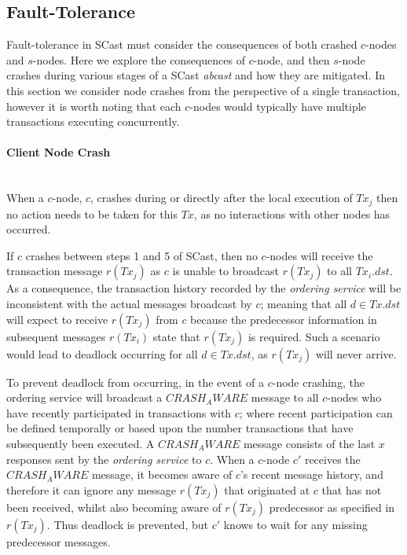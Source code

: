 	\subsection{Fault-Tolerance}
	Fault-tolerance in \textsf{SCast} must consider the consequences of both crashed $c$-nodes and $s$-nodes.  Here we explore the consequences of $c$-node, and then $s$-node crashes during various stages of a \textsf{SCast} \emph{abcast} and how they are mitigated.  In this section we consider node crashes from the perspective of a single transaction, however it is worth noting that each $c$-nodes would typically have multiple transactions executing concurrently.  
	
	\paragraph{Client Node Crash} \hspace{0pt} \\
	When a $c$-node, $c$, crashes during or directly after the local execution of $Tx_j$ then no action needs to be taken for this $Tx$, as no interactions with other nodes has occurred.  
	
	If $c$ crashes between steps 1 and 5 of \textsf{SCast}, then no $c$-nodes will receive the transaction message $r(Tx_j)$ as $c$ is unable to broadcast $r(Tx_j)$ to all $Tx_i.dst$.  As a consequence, the transaction history recorded by the \emph{ordering service} will be inconsistent with the actual messages broadcast by $c$; meaning that all $d \in Tx.dst$ will expect to receive $r(Tx_j)$ from $c$ because the predecessor information in subsequent messages $r(Tx_i)$ state that $r(Tx_j)$ is required.  Such a scenario would lead to deadlock occurring for all $d \in Tx.dst$, as $r(Tx_j)$ will never arrive.  
	
	To prevent deadlock from occurring, in the event of a $c$-node crashing, the ordering service will broadcast a $CRASH_AWARE$ message to all $c$-nodes who have recently participated in transactions with $c$; where recent participation can be defined temporally or based upon the number transactions that have subsequently been executed.  A $CRASH_AWARE$ message consists of the last $x$ responses sent by the \emph{ordering service} to $c$.  When a $c$-node $c'$ receives the $CRASH_AWARE$ message, it becomes aware of $c$'s recent message history, and therefore it can ignore any message $r(Tx_j)$ that originated at $c$ that has not been received, whilst also becoming aware of $r(Tx_j)$ predecessor as specified in $r(Tx_j)$. Thus deadlock is prevented, but $c'$ knows to wait for any missing predecessor messages.  
	
